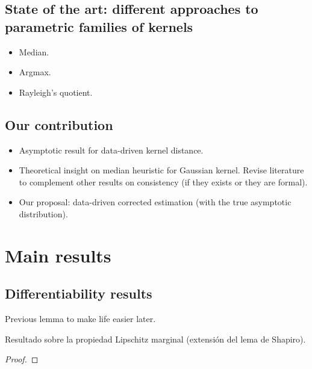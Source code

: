 	\subsection{State of the art: different approaches to parametric families of kernels}
		\begin{itemize}
			\item Median.
			\item Argmax.
			\item Rayleigh's quotient.
		\end{itemize}
	\subsection{Our contribution}
		\begin{itemize}
			\item Asymptotic result for data-driven kernel distance.
			\item Theoretical insight on median heuristic for Gaussian kernel. Revise literature to complement other results on consistency (if they exists or they are formal).
			\item Our proposal: data-driven corrected estimation (with the true asymptotic distribution).
		\end{itemize}
\section{Main results}
	\subsection{Differentiability results}
		{\color{orange} Previous lemma to make life easier later}.
		\begin{Lema}\label{Lema:PartialLipschitz}
			{\color{orange}Resultado sobre la propiedad Lipschitz marginal (extensi\'{o}n del lema de Shapiro).}
		\end{Lema}
		\begin{proof}
			
		\end{proof}
